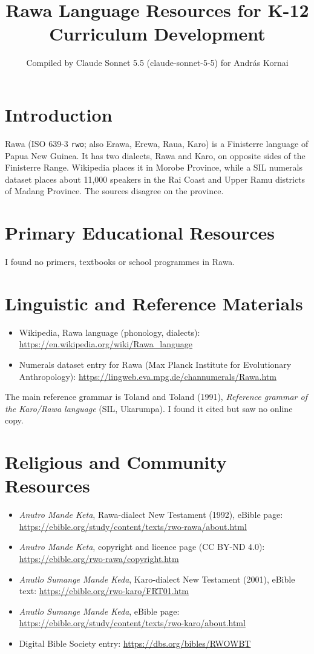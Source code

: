 \documentclass[12pt]{article}
\title{Rawa Language Resources for K-12 Curriculum Development}
\author{Compiled by Claude Sonnet 5.5 (claude-sonnet-5-5) for Andr\'as Kornai}
\date{}
\begin{document}
\maketitle

\section{Introduction}
Rawa (ISO 639-3 \texttt{rwo}; also Erawa, Erewa, Raua, Karo) is a Finisterre language of Papua New Guinea. It has two dialects, Rawa and Karo, on opposite sides of the Finisterre Range. Wikipedia places it in Morobe Province, while a SIL numerals dataset places about 11,000 speakers in the Rai Coast and Upper Ramu districts of Madang Province. The sources disagree on the province.

\section{Primary Educational Resources}
I found no primers, textbooks or school programmes in Rawa.

\section{Linguistic and Reference Materials}
\begin{itemize}
\item Wikipedia, Rawa language (phonology, dialects): \url{https://en.wikipedia.org/wiki/Rawa_language}
\item Numerals dataset entry for Rawa (Max Planck Institute for Evolutionary Anthropology): \url{https://lingweb.eva.mpg.de/channumerals/Rawa.htm}
\end{itemize}
The main reference grammar is Toland and Toland (1991), \emph{Reference grammar of the Karo/Rawa language} (SIL, Ukarumpa). I found it cited but saw no online copy.

\section{Religious and Community Resources}
\begin{itemize}
\item \emph{Anutro Mande Keta}, Rawa-dialect New Testament (1992), eBible page: \url{https://ebible.org/study/content/texts/rwo-rawa/about.html}
\item \emph{Anutro Mande Keta}, copyright and licence page (CC BY-ND 4.0): \url{https://ebible.org/rwo-rawa/copyright.htm}
\item \emph{Anutlo Sumange Mande Keda}, Karo-dialect New Testament (2001), eBible text: \url{https://ebible.org/rwo-karo/FRT01.htm}
\item \emph{Anutlo Sumange Mande Keda}, eBible page: \url{https://ebible.org/study/content/texts/rwo-karo/about.html}
\item Digital Bible Society entry: \url{https://dbs.org/bibles/RWOWBT}
\end{itemize}
\end{document}
